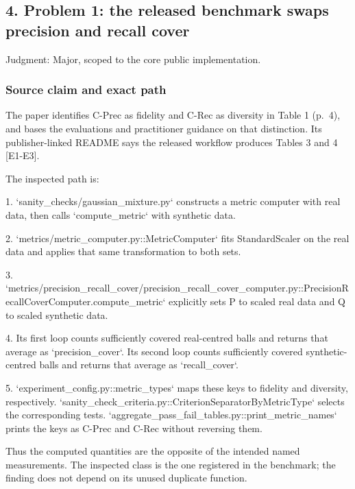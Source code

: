 \documentclass[10pt]{article}
\begin{document}
\subsection*{4. Problem 1: the released benchmark swaps precision and recall cover}
Judgment: Major, scoped to the core public implementation.\par
\subsubsection*{Source claim and exact path}
The paper identifies C-Prec as fidelity and C-Rec as diversity in Table 1 (p. 4), and bases the evaluations and practitioner guidance on that distinction. Its publisher-linked README says the released workflow produces Tables 3 and 4 [E1-E3].\par
The inspected path is:\par
1. `sanity\_checks/gaussian\_mixture.py` constructs a metric computer with real data, then calls `compute\_metric` with synthetic data.\par
2. `metrics/metric\_computer.py::MetricComputer` fits StandardScaler on the real data and applies that same transformation to both sets.\par
3. `metrics/precision\_recall\_cover/precision\_recall\_cover\_computer.py::PrecisionRecallCoverComputer.compute\_metric` explicitly sets P to scaled real data and Q to scaled synthetic data.\par
4. Its first loop counts sufficiently covered real-centred balls and returns that average as `precision\_cover`. Its second loop counts sufficiently covered synthetic-centred balls and returns that average as `recall\_cover`.\par
5. `experiment\_config.py::metric\_types` maps these keys to fidelity and diversity, respectively. `sanity\_check\_criteria.py::CriterionSeparatorByMetricType` selects the corresponding tests. `aggregate\_pass\_fail\_tables.py::print\_metric\_names` prints the keys as C-Prec and C-Rec without reversing them.\par
Thus the computed quantities are the opposite of the intended named measurements. The inspected class is the one registered in the benchmark; the finding does not depend on its unused duplicate function.\par
\end{document}
